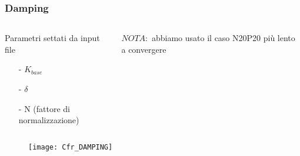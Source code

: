 \begin{frame}
\frametitle{Damping}
\begin{columns}
\begin{column}{0.5 \textwidth}
\begin{exampleblock}{Parametri settati da input file}
\begin{itemize}
\item[-] $K_{base}$
\item[-] $\delta$
\item[-] N (fattore di normalizzazione)
\end{itemize}
\end{exampleblock}
\end{column}
\begin{column}{0.4 \textwidth}
$NOTA:$ abbiamo usato il caso N20P20 pi\`u lento a convergere
\end{column}
\end{columns}
\begin{center}
\begin{figure}[!h]
          {\texttt{[image: Cfr\_DAMPING]}}
\end{figure}
\end{center}
\end{frame}


